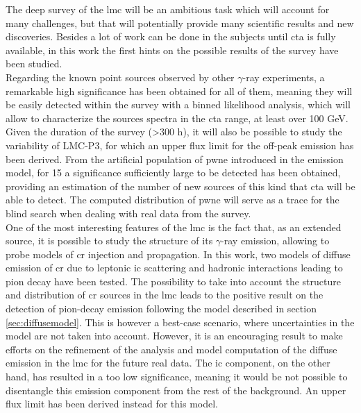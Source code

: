 \documentclass{article}
\begin{document}
The deep survey of the \gls{lmc} will be an ambitious task which will account for many challenges, but that will potentially provide many scientific results and new discoveries. Besides a lot of work can be done in the subjects until \gls{cta} is fully available, in this work the first hints on the possible results of the survey have been studied.\\
Regarding the known point sources observed by other $\gamma$-ray experiments, a remarkable high significance has been obtained for all of them, meaning they will be easily detected within the survey with a binned likelihood analysis, which will allow to characterize the sources spectra in the \gls{cta} range, at least over 100 GeV. Given the duration of the survey (>300 h), it will also be possible to study the variability of LMC-P3, for which an upper flux limit for the off-peak emission has been derived. From the artificial population of \gls{pwne} introduced in the emission model, for 15 a significance sufficiently large to be detected has been obtained, providing an estimation of the number of new sources of this kind that \gls{cta} will be able to detect. The computed distribution of \gls{pwne} will serve as a trace for the blind search when dealing with real data from the survey.\\
One of the most interesting features of the \gls{lmc} is the fact that, as an extended source, it is possible to study the structure of its $\gamma$-ray emission, allowing to probe models of \gls{cr} injection and propagation. In this work, two models of diffuse emission of \gls{cr} due to leptonic \gls{ic} scattering and hadronic interactions leading to pion decay have been tested. The possibility to take into account the structure and distribution of \gls{cr} sources in the \gls{lmc} leads to the positive result on the detection of pion-decay emission following the model described in section \ref{sec:diffusemodel}. This is however a best-case scenario, where uncertainties in the model are not taken into account. However, it is an encouraging result to make efforts on the refinement of the analysis and model computation of the diffuse emission in the \gls{lmc} for the future real data. The \gls{ic} component, on the other hand, has resulted in a too low significance, meaning it would be not possible to disentangle this emission component from the rest of the background. An upper flux limit has been derived instead for this model.\\
\end{document}
